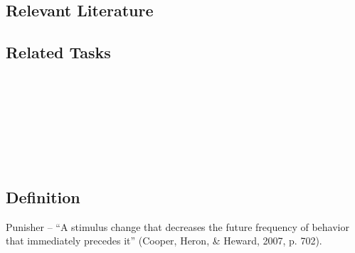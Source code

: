 \subsection{Relevant Literature}
\begin{refsection}
\nocite{test,alang2017police,clayton2018black}
\printbibliography[heading=none]
\end{refsection}
%
\subsection{Related Tasks}
\fourdTen{}\\
\fourdThirteen{}\\
\fourFKFourtyThree{}\\
\fourFKFourtyFour{}\\
\fourFKFourtyFive{}\\
\fourFKFourtySix{}\\
%
%
%
%
\section{\fourdFifteen{}}
\subsection{Definition}
Punisher – ``A stimulus change that decreases the future frequency of behavior that immediately precedes it'' (Cooper, Heron, \& Heward, 2007, p. 702).  

